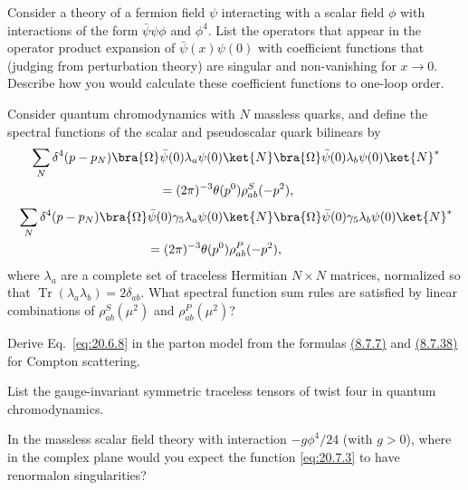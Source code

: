 
\begin{enumerate}
 Consider a theory of a fermion field $\psi$ interacting with a scalar field $\phi$ with interactions of the form $\bar\psi\psi\phi$ and $\phi^4$. List the operators that appear in the operator product expansion of $\bar\psi(x)\psi(0)$ with coefficient functions that (judging from perturbation theory) are singular and non-vanishing for $x\to0$. Describe how you would calculate these coefficient functions to one-loop order.

 Consider quantum chromodynamics with $N$ massless quarks, and define the spectral functions of the scalar and pseudoscalar quark bilinears by
\[
\begin{aligned}
&\sum_N\delta^4(p-p_N)
\bra{\Omega}\bar\psi(0)\lambda_a\psi(0)\ket{N}
\bra{\Omega}\bar\psi(0)\lambda_b\psi(0)\ket{N}^{*}
\\
&\hspace{36mm}
=(2\pi)^{-3}\theta(p^0)\rho_{ab}^{S}(-p^2),
\end{aligned}
\]
\[
\begin{aligned}
&\sum_N\delta^4(p-p_N)
\bra{\Omega}\bar\psi(0)\gamma_5\lambda_a\psi(0)\ket{N}
\bra{\Omega}\bar\psi(0)\gamma_5\lambda_b\psi(0)\ket{N}^{*}
\\
&\hspace{36mm}
=(2\pi)^{-3}\theta(p^0)\rho_{ab}^{P}(-p^2),
\end{aligned}
\]
where $\lambda_a$ are a complete set of traceless Hermitian $N\times N$ matrices, normalized so that $\operatorname{Tr}(\lambda_a\lambda_b)=2\delta_{ab}$. What spectral function sum rules are satisfied by linear combinations of $\rho_{ab}^{S}(\mu^2)$ and $\rho_{ab}^{P}(\mu^2)$?

 Derive Eq.~\eqref{eq:20.6.8} in the parton model from the formulas \hyperref[eq:8.7.7]{(8.7.7)} and \hyperref[eq:8.7.38]{(8.7.38)} for Compton scattering.

 List the gauge-invariant symmetric traceless tensors of twist four in quantum chromodynamics.

 In the massless scalar field theory with interaction $-g\phi^4/24$ (with $g>0$), where in the complex plane would you expect the function \eqref{eq:20.7.3} to have renormalon singularities?
\end{enumerate}
